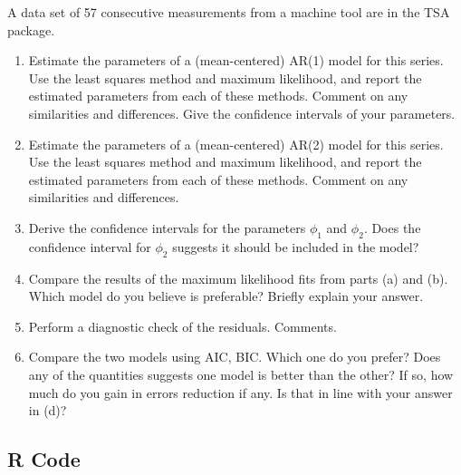 A data set of 57 consecutive measurements from a machine tool are in the TSA package.
\begin{enumerate}[label=(\alph*)]
    \item Estimate the parameters of a (mean-centered) AR(1) model for this series. Use the least
squares method and maximum likelihood, and report the estimated parameters from each of
these methods. Comment on any similarities and differences. Give the confidence intervals of
your parameters.
    \item Estimate the parameters of a (mean-centered) AR(2) model for this series. Use the least
squares method and maximum likelihood, and report the estimated parameters from each of
these methods. Comment on any similarities and differences.
    \item Derive the confidence intervals for the parameters $\phi_1$ and $\phi_2$. Does the confidence interval for $\phi_2$ suggests it should be included in the model?
    \item Compare the results of the maximum likelihood fits from parts (a) and (b). Which model
do you believe is preferable? Briefly explain your answer.
    \item Perform a diagnostic check of the residuals. Comments.
    \item Compare the two models using AIC, BIC. Which one do you prefer? Does any of the
quantities suggests one model is better than the other? If so, how much do you gain in errors reduction if any. Is that in line with your answer in (d)?
\end{enumerate}

\subsection{R Code}

\newpage
